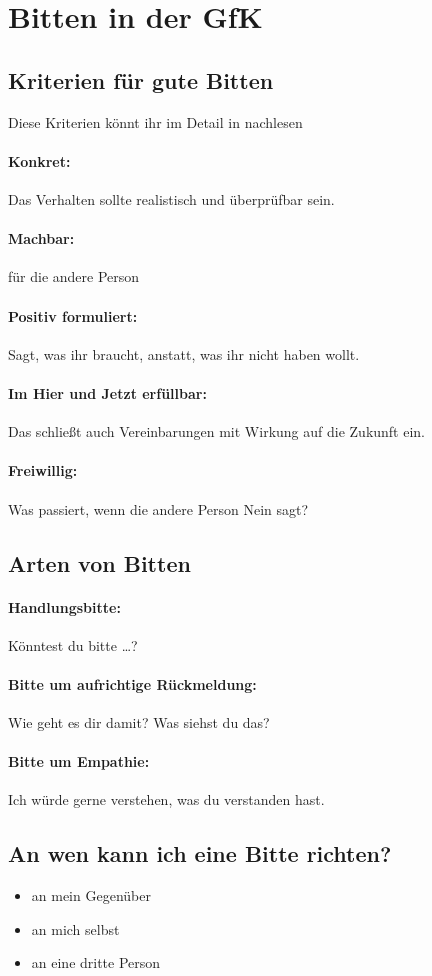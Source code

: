 \section{Bitten in der GfK}
\label{bitten}

\subsection{Kriterien für gute Bitten}

Diese Kriterien könnt ihr im Detail in \cite[S. 85f]{gfk-dummies} nachlesen

\paragraph{Konkret:} Das Verhalten sollte realistisch und überprüfbar sein.

\paragraph{Machbar:} für die andere Person

\paragraph{Positiv formuliert:} Sagt, was ihr braucht, anstatt, was ihr nicht haben wollt.

\paragraph{Im Hier und Jetzt erfüllbar:} Das schließt auch Vereinbarungen mit Wirkung auf die Zukunft ein.

\paragraph{Freiwillig:} Was passiert, wenn die andere Person Nein sagt?


\subsection{Arten von Bitten}

\paragraph{Handlungsbitte:} Könntest du bitte …?

\paragraph{Bitte um aufrichtige Rückmeldung:} Wie geht es dir damit? Was siehst du das?

\paragraph{Bitte um Empathie:} Ich würde gerne verstehen, was du verstanden hast.


\subsection{An wen kann ich eine Bitte richten?}

\begin{itemize}
  \item an mein Gegenüber
  \item an mich selbst
  \item an eine dritte Person
\end{itemize}

